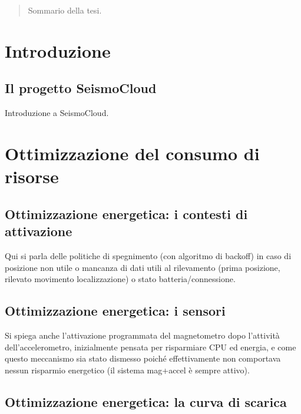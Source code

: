 \documentclass[a4paper,10pt]{memoir}
\begin{document}
\frontmatter

\maketitle
\cleardoublepage

\begin{abstract}
	\thispagestyle{plain}
	Sommario della tesi.
\end{abstract}
\cleardoublepage

\tableofcontents
\cleardoublepage

\mainmatter

\chapter{Introduzione}

\section{Il progetto SeismoCloud}

Introduzione a SeismoCloud.

\chapter{Ottimizzazione del consumo di risorse}

\section{Ottimizzazione energetica: i contesti di attivazione}

Qui si parla delle politiche di spegnimento (con algoritmo di backoff) in caso di posizione non utile o mancanza di dati utili al rilevamento (prima posizione, rilevato movimento localizzazione) o stato batteria/connessione.

\section{Ottimizzazione energetica: i sensori}

Si spiega anche l'attivazione programmata del magnetometro dopo l'attività dell'accelerometro, inizialmente pensata per risparmiare CPU ed energia, e come questo meccanismo sia stato dismesso poiché effettivamente non comportava nessun risparmio energetico (il sistema mag+accel è sempre attivo).

\section{Ottimizzazione energetica: la curva di scarica}
\end{document}
